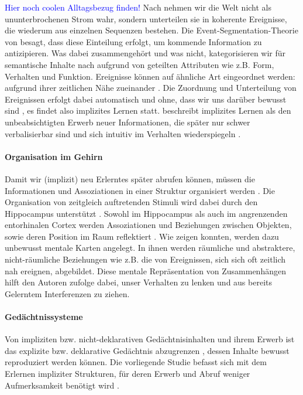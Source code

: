 \textcolor{blue}{Hier noch coolen Alltagsbezug finden!}
Nach \cite{Kurby2008} nehmen wir die Welt nicht als ununterbrochenen Strom wahr, sondern unterteilen sie in koherente Ereignisse, die wiederum aus einzelnen Sequenzen bestehen. Die Event-Segmentation-Theorie von \cite{Zacks2007} besagt, dass diese Einteilung erfolgt, um kommende Information zu antizipieren.
Was dabei zusammengehört und was nicht, kategorisieren wir für semantische Inhalte nach \cite{Medin1978} aufgrund von geteilten Attributen wie z.B. Form, Verhalten und Funktion. Ereignisse können auf ähnliche Art eingeordnet werden: aufgrund ihrer zeitlichen Nähe zueinander \citep{Schapiro2013}. Die Zuordnung und Unterteilung von Ereignissen erfolgt dabei automatisch und ohne, dass wir uns darüber bewusst sind \citep{Kurby2008}, es findet also implizites Lernen statt. \cite{Berry1993} beschreibt implizites Lernen als den unbeabsichtigten Erwerb neuer Informationen, die später nur schwer verbalisierbar sind und sich intuitiv im Verhalten wiederspiegeln \citep{Kamiya2015}.

\paragraph{Organisation im Gehirn}
Damit wir (implizit) neu Erlerntes später abrufen können, müssen die Informationen und Assoziationen in einer Struktur organisiert werden \citep{Garvert2017}.
Die Organisation von zeitgleich auftretenden Stimuli wird dabei durch den Hippocampus unterstützt \citep{Schapiro2013}.
Sowohl im Hippocampus als auch im angrenzenden entorhinalen Cortex werden Assoziationen und Beziehungen zwischen Objekten, sowie deren Position im Raum reflektiert \citep{Horner2015, Schapiro2013}.
Wie \cite{Garvert2017} zeigen konnten, werden dazu unbewusst mentale Karten angelegt. In ihnen werden räumliche und abstraktere, nicht-räumliche Beziehungen wie z.B. die von Ereignissen, sich sich oft zeitlich nah ereignen, abgebildet.
Diese mentale Repräsentation von Zusammenhängen hilft den Autoren zufolge dabei, unser Verhalten zu lenken und aus bereits Gelerntem Interferenzen zu ziehen.

\paragraph{Gedächtnissysteme}
Von impliziten bzw. nicht-deklarativen Gedächtnisinhalten und ihrem Erwerb ist das explizite bzw. deklarative Gedächtnis abzugrenzen \citep{Squire1996}, dessen Inhalte bewusst reproduziert werden können. Die vorliegende Studie befasst sich mit dem Erlernen impliziter Strukturen, für deren Erwerb und Abruf weniger Aufmerksamkeit benötigt wird \citep[see][]{Gruber}.

